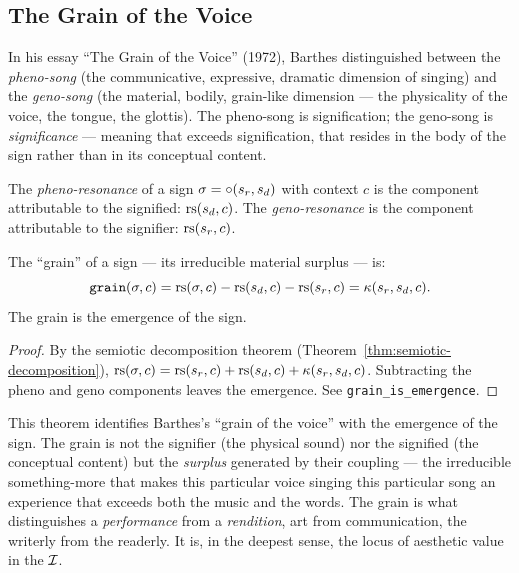 \subsection{The Grain of the Voice}

In his essay ``The Grain of the Voice'' (1972), Barthes distinguished
between the \emph{pheno-song} (the communicative, expressive, dramatic
dimension of singing) and the \emph{geno-song} (the material, bodily,
grain-like dimension --- the physicality of the voice, the tongue, the
glottis). The pheno-song is signification; the geno-song is
\emph{significance} --- meaning that exceeds signification, that
resides in the body of the sign rather than in its conceptual content.

\begin{definition}
\label{def:pheno-geno}
The \emph{pheno-resonance} of a sign $\sigma = \circ(s_r, s_d)$
with context $c$ is the component attributable to the signified:
$\mathrm{rs}(s_d, c)$. The \emph{geno-resonance} is the component
attributable to the signifier: $\mathrm{rs}(s_r, c)$.
\end{definition}

\begin{theorem}
\label{thm:grain-remainder}
The ``grain'' of a sign --- its irreducible material surplus --- is:
\[
  \texttt{grain}(\sigma, c) = \mathrm{rs}(\sigma, c) - \mathrm{rs}(s_d, c) - \mathrm{rs}(s_r, c)
  = \kappa(s_r, s_d, c).
\]
The grain is the emergence of the sign.
\end{theorem}

\begin{proof}
By the semiotic decomposition theorem
(Theorem~\ref{thm:semiotic-decomposition}), $\mathrm{rs}(\sigma, c) =
\mathrm{rs}(s_r, c) + \mathrm{rs}(s_d, c) + \kappa(s_r, s_d, c)$. Subtracting the
pheno and geno components leaves the emergence. See
\texttt{grain\_is\_emergence}.
\end{proof}

\begin{interpretation}
This theorem identifies Barthes's ``grain of the voice'' with the
emergence of the sign. The grain is not the signifier (the physical
sound) nor the signified (the conceptual content) but the
\emph{surplus} generated by their coupling --- the irreducible
something-more that makes this particular voice singing this
particular song an experience that exceeds both the music and the
words. The grain is what distinguishes a \emph{performance} from a
\emph{rendition}, art from communication, the writerly from the
readerly. It is, in the deepest sense, the locus of aesthetic value
in the $\mathcal{I}$.
\end{interpretation}

